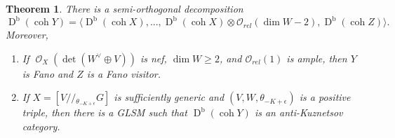 \documentclass[reqno, 12pt]{amsart}
\newtheorem{theorem}{Theorem}[section]
\theoremstyle{definition}
\newcommand{\op}[1]{\operatorname{#1}}
\newcommand{\modmod}[1]{/ \! \! / \!_{#1}}
\newcommand{\dbcoh}[1]{\operatorname{D}^{\operatorname{b}}(\operatorname{coh }#1)}
\def\O{\op{\mathcal{O}}}
\numberwithin{equation}{section}
\begin{document}
\begin{theorem}  \label{thm: fano visitor}
There is a semi-orthogonal decomposition
\begin{equation}\label{eq: Fano Visitor}
 \dbcoh{Y} = \langle \dbcoh{X}, ..., \dbcoh{X}\otimes \mathcal O_{rel}(\dim W-2), \dbcoh{Z}\rangle.
\end{equation}
Moreover, 
\begin{enumerate}
    \item If $\O_X(\det(W^\vee\oplus V))$ is nef, $\dim W \ge 2$, and $\mathcal O_{rel}(1)$ is ample, then $Y$ is Fano and $Z$ is a Fano visitor.
    \item If $X = [V\modmod{\theta_{-K+\epsilon}} G]$ is sufficiently generic and $(V, W, \theta_{-K+\epsilon})$ is a positive triple, then there is a GLSM such that $\dbcoh{Y}$ is an anti-Kuznetsov category.  
\end{enumerate}
\end{theorem}
\end{document}
